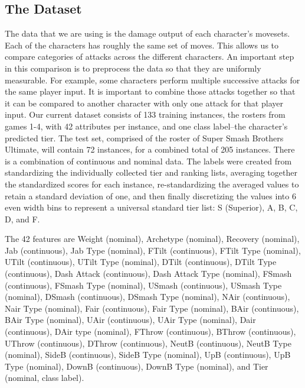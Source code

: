 \documentclass{article}
\begin{document}
\subsection{The Dataset}
 The data that we are using is the damage output of each character’s movesets. Each of the characters has roughly the same set of moves. This allows us to compare categories of attacks across the different characters. An important step in this comparison is to preprocess the data so that they are uniformly measurable. For example, some characters perform multiple successive attacks for the same player input. It is important to combine those attacks together so that it can be compared to another character with only one attack for that player input.
Our current dataset consists of 133 training instances, the rosters from games 1-4, with 42 attributes per instance, and one class label--the character’s predicted tier. The test set, comprised of the roster of Super Smash Brothers Ultimate, will contain 72 instances, for a combined total of 205 instances. There is a combination of continuous and nominal data.
The labels were created from standardizing the individually collected tier and ranking lists, averaging together the standardized scores for each instance, re-standardizing the averaged values to retain a standard deviation of one, and then finally discretizing the values into 6 even width bins to represent a universal standard tier list: S (Superior), A, B, C, D, and F.

The 42 features are Weight (nominal), Archetype (nominal), Recovery (nominal), Jab (continuous), Jab Type (nominal), FTilt (continuous), FTilt Type (nominal), UTilt (continuous), UTilt Type (nominal), DTilt (continuous), DTilt Type (continuous), Dash Attack (continuous), Dash Attack Type (nominal), FSmash (continuous), FSmash Type (nominal), USmash (continuous), USmash Type (nominal), DSmash (continuous), DSmash Type (nominal), NAir (continuous), Nair Type (nominal), Fair (continuous), Fair Type (nominal), BAir (continuous), BAir Type (nominal), UAir (continuous), UAir Type (nominal), Dair (continuous), DAir type (nominal), FThrow (continuous), BThrow (continuous), UThrow (continuous), DThrow (continuous), NeutB (continuous), NeutB Type (nominal), SideB (continuous), SideB Type (nominal), UpB (continuous), UpB Type (nominal), DownB (continuous), DownB Type (nominal), and Tier (nominal, class label).
\end{document}
